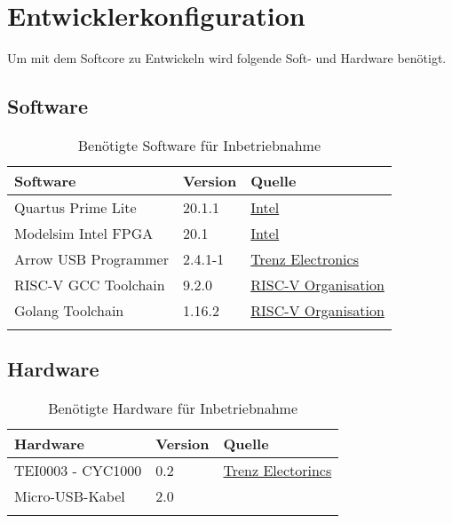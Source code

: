 \chapter{Entwicklerkonfiguration}
    Um mit dem Softcore zu Entwickeln wird folgende Soft- und Hardware benötigt.

    \section{Software}
        \begin{center}
            \begin{longtable}{| l | l | l |}
                \hline
                    Software & Version & Quelle \\
                \hline
                    Quartus Prime Lite & 20.1.1 & \href{https://fpgasoftware.intel.com/?edition=lite}{Intel}\\
                \hline
                    Modelsim Intel FPGA & 20.1 & \href{https://fpgasoftware.intel.com/?product=modelsim_ae#tabs-2}{Intel}\\
                \hline
                    Arrow USB Programmer & 2.4.1-1 & \href{https://wiki.trenz-electronic.de/display/PD/Arrow+USB+Programmer#ArrowUSBProgrammer-DownloadSetupFiles}{Trenz Electronics}\\
                \hline
                    RISC-V GCC Toolchain & 9.2.0 & \href{https://github.com/riscv/riscv-gnu-toolchain}{RISC-V Organisation}\\
                \hline
                    Golang Toolchain & 1.16.2 & \href{https://golang.org/}{RISC-V Organisation}\\
                \hline
                \caption{Benötigte Software für Inbetriebnahme}
            \end{longtable}
        \end{center}

    \section{Hardware}
        \begin{center}
            \begin{longtable}{| l | l | l |}
                \hline
                    Hardware & Version & Quelle \\
                \hline
                    TEI0003 - CYC1000 & 0.2 & \href{https://wiki.trenz-electronic.de/display/PD/TEI0003+Getting+Started}{Trenz Electorincs}\\
                \hline
                    Micro-USB-Kabel & 2.0 & \\
                \hline
                \caption{Benötigte Hardware für Inbetriebnahme}
            \end{longtable}
        \end{center}
